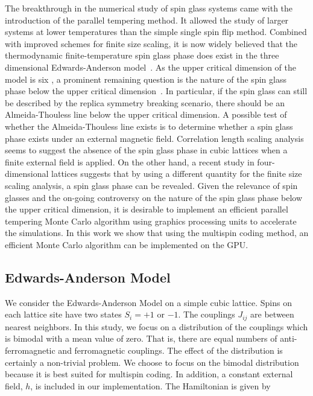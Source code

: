 The breakthrough in the numerical study of spin glass systems came with the 
introduction of the parallel tempering method. It allowed the study of larger 
systems at lower temperatures than the simple single spin flip %
method. \cite{Swendsen-Wang-1986,Hukushima-Nemoto1996,Marinari-Parisi1992} Combined with 
improved schemes for finite size scaling, it is now widely believed that the thermodynamic 
finite-temperature spin glass phase does exist in the three dimensional Edwards-Anderson 
model~\cite{PhysRevB.62.14237}. As the upper critical dimension of the 
model is six \cite{Harris-Lubensky-Chen-1976,Tasaki-1989,Green-Moore-Bray-1983}, a
prominent remaining question is the nature of the 
spin glass phase below the upper critical dimension~\cite{Young-Katzgraber2004}. 
In particular, if the spin glass can still be described by the replica symmetry 
breaking scenario, there should be an Almeida-Thouless line below the upper 
critical dimension. A possible test of whether the Almeida-Thouless 
line exists is to determine whether a spin glass phase exists under an external 
magnetic field. Correlation length scaling analysis seems to suggest the 
absence of the spin glass phase in cubic lattices when a finite external field is applied.\cite{Young-Katzgraber2004} 
On the other hand, a recent study in four-dimensional lattices suggests that by using a different quantity for the 
finite size scaling analysis, a spin glass phase can be revealed. \cite{Banos-2012} 
Given the relevance of spin glasses and the on-going controversy on the nature 
of the spin glass phase below the upper critical dimension, it is desirable to 
implement an efficient parallel tempering Monte Carlo algorithm using 
graphics processing units to accelerate the simulations. In this work we show that 
using the multispin coding method, \cite{Zorn1981337} an efficient Monte Carlo algorithm can be implemented 
on the GPU. 


\subsection{Edwards-Anderson Model}

We consider the Edwards-Anderson Model \cite{Edwards-Anderson1975} on a 
simple cubic lattice. Spins on each lattice site have two states 
$S_i=+1$ or $-1$. The couplings $J_{ij}$ are between nearest neighbors. In this 
study, we focus on a distribution of the couplings which is bimodal with a mean 
value of zero. That is, there are equal numbers of anti-ferromagnetic and ferromagnetic 
couplings. The effect of the distribution is certainly a non-trivial problem. 
We choose to focus on the bimodal distribution  because it is best suited for multispin coding. 
In addition, a constant external field, $h$, is included in our implementation. 
The Hamiltonian is given by 

